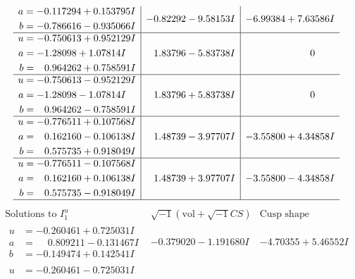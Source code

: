 \documentclass[1p]{elsarticle_modified}
\theoremstyle{definition}
\newcommand{\I}{\sqrt{-1}}
\begin{document}
$$\begin{array}{c|c|c}
\begin{aligned}
a &= -0.117294 + 0.153795 I \\
b &= -0.786616 - 0.935066 I\end{aligned}
 & -0.82292 - 9.58153 I & -6.99384 + 7.63586 I \\ \hline\begin{aligned}
u &= -0.750613 + 0.952129 I \\
a &= -1.28098 + 1.07814 I \\
b &= \phantom{-}0.964262 + 0.758591 I\end{aligned}
 & \phantom{-}1.83796 - 5.83738 I & \phantom{-0.000000 } 0 \\ \hline\begin{aligned}
u &= -0.750613 - 0.952129 I \\
a &= -1.28098 - 1.07814 I \\
b &= \phantom{-}0.964262 - 0.758591 I\end{aligned}
 & \phantom{-}1.83796 + 5.83738 I & \phantom{-0.000000 } 0 \\ \hline\begin{aligned}
u &= -0.776511 + 0.107568 I \\
a &= \phantom{-}0.162160 - 0.106138 I \\
b &= \phantom{-}0.575735 + 0.918049 I\end{aligned}
 & \phantom{-}1.48739 - 3.97707 I & -3.55800 + 4.34858 I \\ \hline\begin{aligned}
u &= -0.776511 - 0.107568 I \\
a &= \phantom{-}0.162160 + 0.106138 I \\
b &= \phantom{-}0.575735 - 0.918049 I\end{aligned}
 & \phantom{-}1.48739 + 3.97707 I & -3.55800 - 4.34858 I\\
 \hline 
 \end{array}$$\newpage$$\begin{array}{c|c|c}  
\text{Solutions to }I^u_{1}& \I (\text{vol} + \sqrt{-1}CS) & \text{Cusp shape}\\
 \hline 
\begin{aligned}
u &= -0.260461 + 0.725031 I \\
a &= \phantom{-}0.809211 - 0.131467 I \\
b &= -0.149474 + 0.142541 I\end{aligned}
 & -0.379020 - 1.191680 I & -4.70355 + 5.46552 I \\ \hline\begin{aligned}
u &= -0.260461 - 0.725031 I \\

\end{aligned}
\end{array}$$
\end{document}
